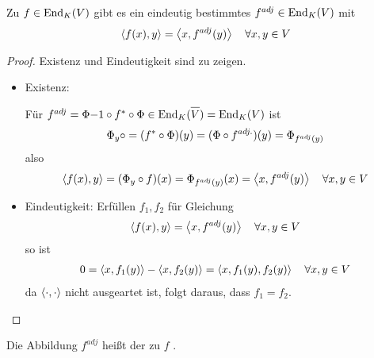 \begin{proposition}
	Zu $f\in\operatorname{End}_K(V)$ gibt es ein eindeutig bestimmtes $f^{adj}\in\operatorname{End}_K(V)$ mit 
	\begin{align}
		\left\langle f(x),y\right\rangle=\left\langle x,f^{adj}(y)\right\rangle\quad\forall x,y\in V\notag
	\end{align}
\end{proposition}
\begin{proof}
	Existenz und Eindeutigkeit sind zu zeigen.
	\begin{itemize}
		\item Existenz:
		\begin{center}
		\end{center}
		Für $f^{adj}=\Phi{-1}\circ f^*\circ \Phi\in \End_K(\overline{V})=\End_K(V)$ ist 
		\begin{align}
			\Phi_y\circ = (f^*\circ \Phi)(y)=(\Phi\circ f^{adj.})(y)=\Phi_{f^{adj}(y)}\notag
		\end{align}
		also
		\begin{align}
			\left\langle f(x),y\right\rangle=(\Phi_y\circ f)(x)=\Phi_{f^{adj}(y)}(x)=\left\langle x,f^{adj}(y)\right\rangle\quad\forall x,y\in V\notag
		\end{align}
		\item Eindeutigkeit: Erfüllen $f_1,f_2$ für Gleichung
		\begin{align}
			\left\langle f(x),y\right\rangle=\left\langle x,f^{adj}(y)\right\rangle\quad\forall x,y\in V\notag
		\end{align}
		so ist
		\begin{align}
			0=\left\langle x,f_1(y)\right\rangle-\left\langle x,f_2(y)\right\rangle=\left\langle x,f_1(y),f_2(y)\right\rangle\quad\forall x,y\in V\notag
		\end{align}
		da $\left\langle \cdot,\cdot\right\rangle$ nicht ausgeartet ist, folgt daraus, dass $f_1=f_2$.
	\end{itemize}
\end{proof}

\begin{definition}
	Die Abbildung $f^{adj}$ heißt der zu $f$ .
\end{definition}

